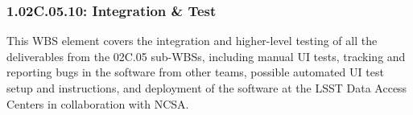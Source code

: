 \subsubsection{1.02C.05.10: Integration \& Test}

This WBS element covers the integration and higher-level testing of all the deliverables from the 02C.05 sub-WBSs, including manual UI tests, tracking and reporting bugs in the software from other teams, possible automated UI test setup and instructions, and deployment of the software at the LSST Data Access Centers in collaboration with NCSA.
